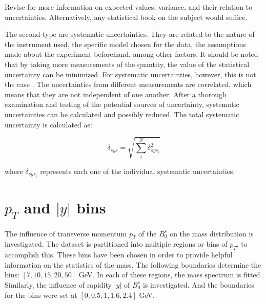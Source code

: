Revise \cite{vsirca2016probability} for more information on expected values, variance, and their relation to uncertainties. Alternatively, any statistical book on the subject would suffice.

The second type are systematic uncertainties. They are related to the nature of the instrument used, the specific model chosen for the data, the assumptions made about the experiment beforehand, among other factors. It should be noted that by taking more measurements of the quantity, the value of the statistical uncertainty can be minimized. For systematic uncertainties, however, this is not the case \cite{sinervo2003definition}. The uncertainties from different measurements are correlated, which means that they are not independent of one another. After a thorough examination and testing of the potential sources of uncertainty, systematic uncertainties can be calculated and possibly reduced. The total systematic uncertainty is calculated as:

\begin{equation}
	\delta_{sys} = \sqrt{\sum_{i}^{N} \delta_{{sys}_{i}}^2}
\end{equation}

where $\delta_{{sys}_i}$ represents each one of the individual systematic uncertainties.

\section{$p_T$ and $|y|$ bins}

The influence of transverse momentum $p_T$ of the $B_0^s$ on the mass distribution is investigated. The dataset is partitioned into multiple regions or bins of $p_T$, to accomplish this. These bins have been chosen in order to provide helpful information on the statistics of the mass. The following boundaries determine the bins: $[7, 10, 15, 20, 50]$ GeV. In each of these regions, the mass spectrum is fitted. Similarly, the influence of rapidity $|y|$ of $B_0^s$ is investigated. And the boundaries for the bins were set at $[0, 0.5, 1, 1.6, 2.4]$ GeV.

